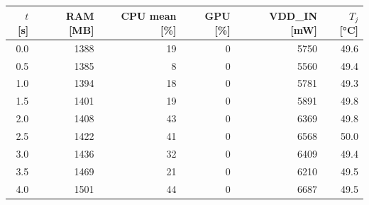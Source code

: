 \begin{tabular}{@{}rrrrrr@{}}
\toprule
$t$ [s] & RAM [MB] & CPU mean [\%] & GPU [\%] & VDD\_IN [mW] & $T_j$ [\si{\celsius}] \\
\midrule
0.0 & 1388 & 19 & 0 & 5750 & 49.6 \\
0.5 & 1385 & 8 & 0 & 5560 & 49.4 \\
1.0 & 1394 & 18 & 0 & 5781 & 49.3 \\
1.5 & 1401 & 19 & 0 & 5891 & 49.8 \\
2.0 & 1408 & 43 & 0 & 6369 & 49.8 \\
2.5 & 1422 & 41 & 0 & 6568 & 50.0 \\
3.0 & 1436 & 32 & 0 & 6409 & 49.4 \\
3.5 & 1469 & 21 & 0 & 6210 & 49.5 \\
4.0 & 1501 & 44 & 0 & 6687 & 49.5 \\
\bottomrule
\end{tabular}
